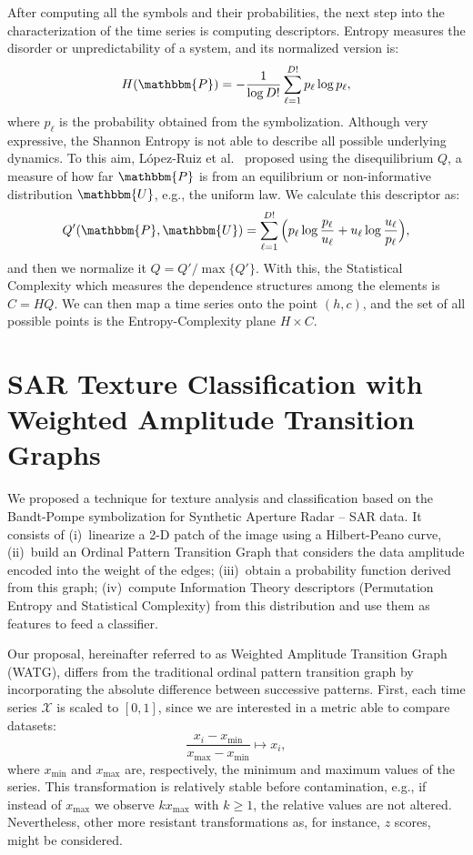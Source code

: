 \documentclass[a4,11pt]{pssbmac}
\begin{document}
After computing all the symbols and their probabilities, the next step into the characterization of the time series is computing descriptors.
Entropy measures the disorder or unpredictability of a system, and its normalized version is:	
\begin{equation}
	H(\mathbbm{P}) = - \frac{1}{\log D!}\sum_{\ell = 1}^{D!} p_\ell \log p_\ell,
	\label{eq:Entropia}
\end{equation}
where $p_\ell$ is the probability obtained from the symbolization.
Although very expressive, the Shannon Entropy is not able to describe all possible underlying dynamics.
To this aim, L\'opez-Ruiz et al.~\cite{LopezRuiz1995} proposed using the disequilibrium  $Q$, a measure of how far $\mathbbm{P}$ is from an equilibrium or non-informative distribution $\mathbbm{U}$, e.g., the uniform law.
We calculate this descriptor as:
\begin{equation}
	Q'(\mathbbm{P}, \mathbbm{U}) = \sum_{\ell=1}^{D!} \Big(p_\ell \log\frac{p_\ell}{u_\ell} +
	u_\ell \log\frac{u_\ell}{p_\ell}
	\Big),
\end{equation}
and then we normalize it $Q = Q'/\max\{Q'\}$.
With this, the Statistical Complexity which measures the dependence structures among the elements is $C = HQ$.
We can then map a time series onto the point $(h, c)$, and the set of all possible points is the Entropy-Complexity plane $H \times C$.

\section{SAR Texture Classification with Weighted Amplitude Transition Graphs}\label{WATG}

We proposed a technique for texture analysis and classification based on the Bandt-Pompe symbolization for Synthetic Aperture Radar -- SAR data.
It consists of
(i)~linearize a \mbox{2-D} patch of the image using a Hilbert-Peano curve,
(ii)~build an Ordinal Pattern Transition Graph that considers the data amplitude encoded into the weight of the edges;
(iii)~obtain a probability function derived from this graph;
(iv)~compute Information Theory descriptors (Permutation Entropy and Statistical Complexity) from this distribution and use them as features to feed a classifier.

Our proposal, hereinafter referred to as Weighted Amplitude Transition Graph (WATG), differs from the traditional ordinal pattern transition graph by incorporating the absolute difference between successive patterns. 
First, each time series $\mathcal{X}$ is scaled to $[0, 1]$, since we are interested in a metric able to compare datasets:
\begin{equation}
	\frac{x_i - x_{\min}}{x_{\max} - x_{\min}} \longmapsto x_i,
	\label{eq:scaling}
\end{equation}
where $x_{\min}$ and $x_{\max}$ are, respectively, the minimum and maximum values of the series.
This transformation is relatively stable before contamination, e.g., if instead of $x_{\max}$ we observe $k x_{\max}$ with $k\geq 1$, the relative values are not altered. 
Nevertheless, other more resistant transformations as, for instance, $z$ scores, might be considered.
\end{document}
